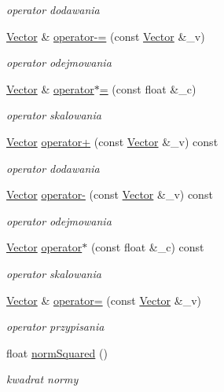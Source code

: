 \begin{DoxyCompactItemize}
\begin{DoxyCompactList}\small\item\em operator dodawania \end{DoxyCompactList}\item 
\hyperlink{class_vector}{Vector} \& \hyperlink{class_vector_aaaf87dbf15cd9492aa0c11874ae5afef}{operator-\/=} (const \hyperlink{class_vector}{Vector} \&\+\_\+v)
\begin{DoxyCompactList}\small\item\em operator odejmowania \end{DoxyCompactList}\item 
\hyperlink{class_vector}{Vector} \& \hyperlink{class_vector_a91ebac6d502ca1d54645e7c711549867}{operator$\ast$=} (const float \&\+\_\+c)
\begin{DoxyCompactList}\small\item\em operator skalowania \end{DoxyCompactList}\item 
\hyperlink{class_vector}{Vector} \hyperlink{class_vector_aa78eb4c9e5ac236c89f0853eefa347ac}{operator+} (const \hyperlink{class_vector}{Vector} \&\+\_\+v) const 
\begin{DoxyCompactList}\small\item\em operator dodawania \end{DoxyCompactList}\item 
\hyperlink{class_vector}{Vector} \hyperlink{class_vector_a94b6fde82bef6532c00358a0af448fc1}{operator-\/} (const \hyperlink{class_vector}{Vector} \&\+\_\+v) const 
\begin{DoxyCompactList}\small\item\em operator odejmowania \end{DoxyCompactList}\item 
\hyperlink{class_vector}{Vector} \hyperlink{class_vector_a8f0e64ee9a688803b1efce30fb0b2869}{operator$\ast$} (const float \&\+\_\+c) const 
\begin{DoxyCompactList}\small\item\em operator skalowania \end{DoxyCompactList}\item 
\hyperlink{class_vector}{Vector} \& \hyperlink{class_vector_ad44f6d9721d9584e7f847e449df73e11}{operator=} (const \hyperlink{class_vector}{Vector} \&\+\_\+v)
\begin{DoxyCompactList}\small\item\em operator przypisania \end{DoxyCompactList}\item 
float \hyperlink{class_vector_a18d3f2110be751ac3a658016bd3dca69}{norm\+Squared} ()
\begin{DoxyCompactList}\small\item\em kwadrat normy \end{DoxyCompactList}\end{DoxyCompactItemize}
